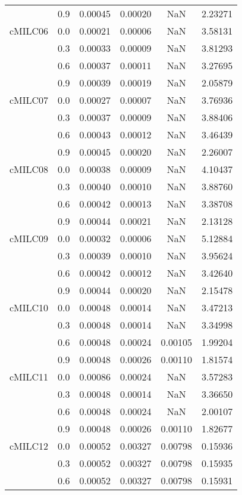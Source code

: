 \begin{longtable}{cccccc}
        & 0.9 & 0.00045 & 0.00020 & NaN & 2.23271 \\
cMILC06 & 0.0 & 0.00021 & 0.00006 & NaN & 3.58131 \\
        & 0.3 & 0.00033 & 0.00009 & NaN & 3.81293 \\
        & 0.6 & 0.00037 & 0.00011 & NaN & 3.27695 \\
        & 0.9 & 0.00039 & 0.00019 & NaN & 2.05879 \\
cMILC07 & 0.0 & 0.00027 & 0.00007 & NaN & 3.76936 \\
        & 0.3 & 0.00037 & 0.00009 & NaN & 3.88406 \\
        & 0.6 & 0.00043 & 0.00012 & NaN & 3.46439 \\
        & 0.9 & 0.00045 & 0.00020 & NaN & 2.26007 \\
cMILC08 & 0.0 & 0.00038 & 0.00009 & NaN & 4.10437 \\
        & 0.3 & 0.00040 & 0.00010 & NaN & 3.88760 \\
        & 0.6 & 0.00042 & 0.00013 & NaN & 3.38708 \\
        & 0.9 & 0.00044 & 0.00021 & NaN & 2.13128 \\
cMILC09 & 0.0 & 0.00032 & 0.00006 & NaN & 5.12884 \\
        & 0.3 & 0.00039 & 0.00010 & NaN & 3.95624 \\
        & 0.6 & 0.00042 & 0.00012 & NaN & 3.42640 \\
        & 0.9 & 0.00044 & 0.00020 & NaN & 2.15478 \\
cMILC10 & 0.0 & 0.00048 & 0.00014 & NaN & 3.47213 \\
        & 0.3 & 0.00048 & 0.00014 & NaN & 3.34998 \\
        & 0.6 & 0.00048 & 0.00024 & 0.00105 & 1.99204 \\
        & 0.9 & 0.00048 & 0.00026 & 0.00110 & 1.81574 \\
cMILC11 & 0.0 & 0.00086 & 0.00024 & NaN & 3.57283 \\
        & 0.3 & 0.00048 & 0.00014 & NaN & 3.36650 \\
        & 0.6 & 0.00048 & 0.00024 & NaN & 2.00107 \\
        & 0.9 & 0.00048 & 0.00026 & 0.00110 & 1.82677 \\
cMILC12 & 0.0 & 0.00052 & 0.00327 & 0.00798 & 0.15936 \\
        & 0.3 & 0.00052 & 0.00327 & 0.00798 & 0.15935 \\
        & 0.6 & 0.00052 & 0.00327 & 0.00798 & 0.15931 \\

\end{longtable}
